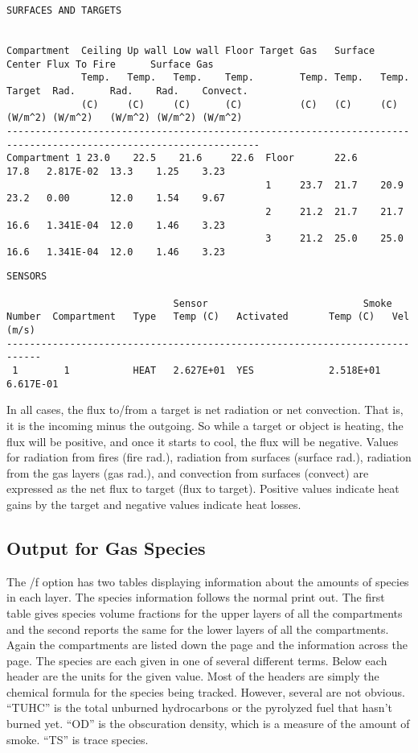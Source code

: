\begin{lstlisting}[basicstyle=\tiny]
SURFACES AND TARGETS


Compartment  Ceiling Up wall Low wall Floor Target Gas   Surface Center Flux To Fire      Surface Gas
             Temp.   Temp.   Temp.    Temp.        Temp. Temp.   Temp.  Target  Rad.      Rad.    Rad.    Convect.
             (C)     (C)     (C)      (C)          (C)   (C)     (C)    (W/m^2) (W/m^2)   (W/m^2) (W/m^2) (W/m^2)
------------------------------------------------------------------------------------------------------------------
Compartment 1 23.0    22.5    21.6     22.6  Floor       22.6            17.8   2.817E-02  13.3    1.25    3.23
                                             1     23.7  21.7    20.9    23.2   0.00       12.0    1.54    9.67
                                             2     21.2  21.7    21.7    16.6   1.341E-04  12.0    1.46    3.23
                                             3     21.2  25.0    25.0    16.6   1.341E-04  12.0    1.46    3.23
\end{lstlisting}

\begin{lstlisting}[basicstyle=\scriptsize]
SENSORS

                             Sensor                           Smoke
Number  Compartment   Type   Temp (C)   Activated       Temp (C)   Vel (m/s)
----------------------------------------------------------------------------
 1        1           HEAT   2.627E+01  YES             2.518E+01  6.617E-01
\end{lstlisting}
In all cases, the flux to/from a target is net radiation or net convection. That is, it is the incoming minus the outgoing. So while a target or object is heating, the flux will be positive, and once it starts to cool, the flux will be negative. Values for radiation from fires (fire rad.), radiation from surfaces (surface rad.), radiation from the gas layers (gas rad.), and convection from surfaces (convect) are expressed as the net flux to target (flux to target). Positive values indicate heat gains by the target and negative values indicate heat losses.


\subsection{Output for Gas Species}

The /f option has two tables displaying information about the amounts of species in each layer. The species information follows the normal print out.  The first table gives species volume fractions for the upper layers of all the compartments and the second reports the same for the lower layers of all the compartments.  Again the compartments are listed down the page and the information across the page.  The species are each given in one of several different terms.  Below each header are the units for the given value.  Most of the headers are simply the chemical formula for the species being tracked.  However, several are not obvious.  ``TUHC'' is the total unburned hydrocarbons or the pyrolyzed fuel that hasn't burned yet.  ``OD'' is the obscuration density, which is a measure of the amount of smoke. ``TS'' is trace species.


